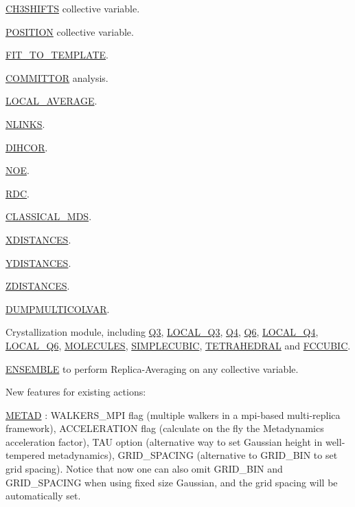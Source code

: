 \begin{DoxyItemize}
\begin{DoxyItemize}
\item \hyperlink{CH3SHIFTS}{C\+H3\+S\+H\+I\+F\+T\+S} collective variable.
\item \hyperlink{POSITION}{P\+O\+S\+I\+T\+I\+O\+N} collective variable.
\item \hyperlink{FIT_TO_TEMPLATE}{F\+I\+T\+\_\+\+T\+O\+\_\+\+T\+E\+M\+P\+L\+A\+T\+E}.
\item \hyperlink{COMMITTOR}{C\+O\+M\+M\+I\+T\+T\+O\+R} analysis.
\item \hyperlink{LOCAL_AVERAGE}{L\+O\+C\+A\+L\+\_\+\+A\+V\+E\+R\+A\+G\+E}.
\item \hyperlink{NLINKS}{N\+L\+I\+N\+K\+S}.
\item \hyperlink{DIHCOR}{D\+I\+H\+C\+O\+R}.
\item \hyperlink{NOE}{N\+O\+E}.
\item \hyperlink{RDC}{R\+D\+C}.
\item \hyperlink{CLASSICAL_MDS}{C\+L\+A\+S\+S\+I\+C\+A\+L\+\_\+\+M\+D\+S}.
\item \hyperlink{XDISTANCES}{X\+D\+I\+S\+T\+A\+N\+C\+E\+S}.
\item \hyperlink{YDISTANCES}{Y\+D\+I\+S\+T\+A\+N\+C\+E\+S}.
\item \hyperlink{ZDISTANCES}{Z\+D\+I\+S\+T\+A\+N\+C\+E\+S}.
\item \hyperlink{DUMPMULTICOLVAR}{D\+U\+M\+P\+M\+U\+L\+T\+I\+C\+O\+L\+V\+A\+R}.
\item Crystallization module, including \hyperlink{Q3}{Q3}, \hyperlink{LOCAL_Q3}{L\+O\+C\+A\+L\+\_\+\+Q3}, \hyperlink{Q4}{Q4}, \hyperlink{Q6}{Q6}, \hyperlink{LOCAL_Q4}{L\+O\+C\+A\+L\+\_\+\+Q4}, \hyperlink{LOCAL_Q6}{L\+O\+C\+A\+L\+\_\+\+Q6}, \hyperlink{MOLECULES}{M\+O\+L\+E\+C\+U\+L\+E\+S}, \hyperlink{SIMPLECUBIC}{S\+I\+M\+P\+L\+E\+C\+U\+B\+I\+C}, \hyperlink{TETRAHEDRAL}{T\+E\+T\+R\+A\+H\+E\+D\+R\+A\+L} and \hyperlink{FCCUBIC}{F\+C\+C\+U\+B\+I\+C}.
\item \hyperlink{ENSEMBLE}{E\+N\+S\+E\+M\+B\+L\+E} to perform Replica-\/\+Averaging on any collective variable.
\end{DoxyItemize}
\item New features for existing actions\+:
\begin{DoxyItemize}
\item \hyperlink{METAD}{M\+E\+T\+A\+D} \+: W\+A\+L\+K\+E\+R\+S\+\_\+\+M\+P\+I flag (multiple walkers in a mpi-\/based multi-\/replica framework), A\+C\+C\+E\+L\+E\+R\+A\+T\+I\+O\+N flag (calculate on the fly the Metadynamics acceleration factor), T\+A\+U option (alternative way to set Gaussian height in well-\/tempered metadynamics), G\+R\+I\+D\+\_\+\+S\+P\+A\+C\+I\+N\+G (alternative to G\+R\+I\+D\+\_\+\+B\+I\+N to set grid spacing). Notice that now one can also omit G\+R\+I\+D\+\_\+\+B\+I\+N and G\+R\+I\+D\+\_\+\+S\+P\+A\+C\+I\+N\+G when using fixed size Gaussian, and the grid spacing will be automatically set.

\end{DoxyItemize}
\end{DoxyItemize}
